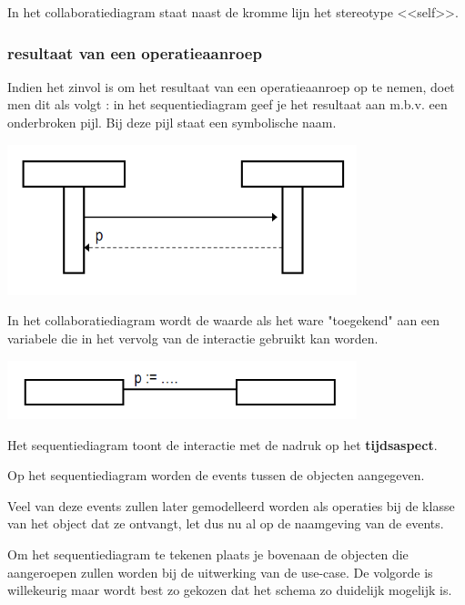 {In het collaboratiediagram staat naast de kromme lijn het stereotype <<self>>.

\subsubsection{resultaat van een operatieaanroep}

Indien het zinvol is om het resultaat van een operatieaanroep op te nemen, doet men dit als volgt : in het sequentiediagram geef je het resultaat aan m.b.v. een onderbroken pijl. Bij deze pijl staat een symbolische naam.


\begin{center}
\includegraphics[width=4in]{img/result1}%
\end{center}

In het collaboratiediagram wordt de waarde als het ware "toegekend"  aan een variabele die in het vervolg van de interactie gebruikt kan worden.


\begin{center}
\includegraphics[width=4in]{img/result2}%
\end{center}

Het sequentiediagram toont de interactie met de nadruk op het \textbf{tijdsaspect}. 

Op het sequentiediagram worden de events tussen de objecten aangegeven. 

Veel van deze events zullen later gemodelleerd worden als operaties bij de klasse van het object dat ze ontvangt, let dus nu al op de naamgeving van de events.

Om het sequentiediagram te tekenen plaats je bovenaan de objecten die aangeroepen zullen worden bij de uitwerking van de use-case. De volgorde is willekeurig maar wordt best zo gekozen dat het schema zo duidelijk mogelijk is.

}
